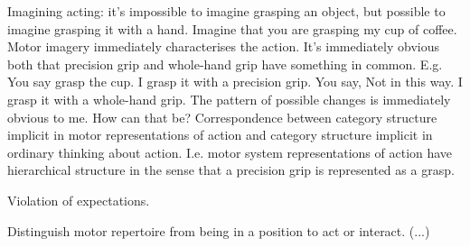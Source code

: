 \documentclass[12pt,a4paper]{extarticle}
\begin{document}
Imagining acting: it's impossible to imagine grasping an object, but possible to imagine grasping it with a hand.   
Imagine that you are grasping my cup of coffee.
Motor imagery immediately characterises the action.
It's immediately obvious both that precision grip and whole-hand grip have something in common.  
E.g. You say grasp the cup.
I grasp it with a precision grip.
You say, Not in this way.
I grasp it with a whole-hand grip.
The pattern of possible changes is immediately obvious to me.
How can that be?
Correspondence between category structure implicit in motor representations of action and category structure implicit in ordinary thinking about action.
I.e. motor system representations of action have hierarchical structure in the sense that a precision grip is represented as a grasp.

Violation of expectations.


Distinguish motor repertoire from being in a position to act or interact. (...)


\end{document}
